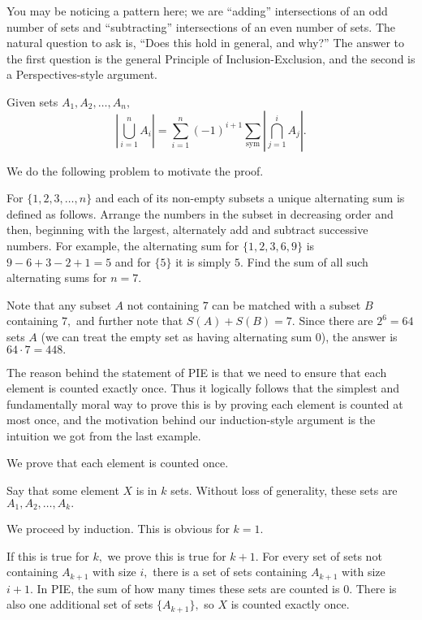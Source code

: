You may be noticing a pattern here; we are ``adding'' intersections of an odd number of sets and ``subtracting'' intersections of an even number of sets. The natural question to ask is, ``Does this hold in general, and why?'' The answer to the first question is the general Principle of Inclusion-Exclusion, and the second is a Perspectives-style argument.
\begin{theo}
Given sets $A_1,A_2,\dots,A_n,$
$$|\bigcup_{i=1}^n A_i|=\sum\limits_{i=1}^{n} (-1)^{i+1}\sum\limits_{\text{sym}}|\bigcap_{j=1}^{i} A_j|.$$
\end{theo}

We do the following problem to motivate the proof.

\begin{exam}[AIME 1983/13]
For $\{1, 2, 3, \ldots, n\}$ and each of its non-empty subsets a unique alternating sum is defined as follows. Arrange the numbers in the subset in decreasing order and then, beginning with the largest, alternately add and subtract successive numbers. For example, the alternating sum for $\{1, 2, 3, 6,9\}$ is $9-6+3-2+1=5$ and for $\{5\}$ it is simply $5$. Find the sum of all such alternating sums for $n=7$. 
\end{exam}

\begin{sol}
Note that any subset $A$ not containing $7$ can be matched with a subset $B$ containing $7,$ and further note that $S(A)+S(B)=7.$ Since there are $2^6=64$ sets $A$ (we can treat the empty set as having alternating sum $0$), the answer is $64\cdot 7=448.$
\end{sol}

The reason behind the statement of PIE is that we need to ensure that each element is counted exactly once. Thus it logically follows that the simplest and fundamentally moral way to prove this is by proving each element is counted at most once, and the motivation behind our induction-style argument is the intuition we got from the last example.

\begin{pro}
We prove that each element is counted once.

Say that some element $X$ is in $k$ sets. Without loss of generality, these sets are $A_1,A_2,\dots,A_k.$

We proceed by induction. This is obvious for $k=1.$

If this is true for $k,$ we prove this is true for $k+1.$ For every set of sets not containing $A_{k+1}$ with size $i,$ there is a set of sets containing $A_{k+1}$ with size $i+1.$ In PIE, the sum of how many times these sets are counted is $0.$ There is also one additional set of sets $\{A_{k+1}\},$ so $X$ is counted exactly once.
\end{pro}


